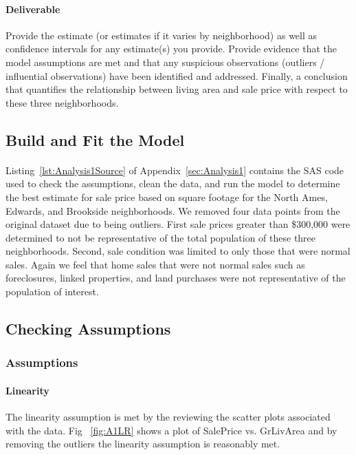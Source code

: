 \documentclass[11pt]{scrartcl} %
\begin{document}
\paragraph{Deliverable} Provide the estimate (or estimates if it varies by neighborhood) as well as confidence intervals for any estimate(s) you provide. Provide evidence that the model assumptions are met and that any suspicious observations (outliers / influential observations) have been identified and addressed. Finally, a conclusion that quantifies the relationship between living area and sale price with respect to these three neighborhoods.
\subsection{Build and Fit the Model}
\paragraph{} Listing~\ref{lst:Analysis1Source} of Appendix~\ref{sec:Analysis1} contains the SAS code used to check the assumptions, clean the data, and run the model to determine the best estimate for sale price based on square footage for the North Ames, Edwards, and Brookside neighborhoods. We removed four data points from the original dataset due to being outliers. First sale prices greater than \$300,000 were determined to not be representative of the total population of these three neighborhoods. Second, sale condition was limited to only those that were normal sales. Again we feel that home sales that were not normal sales such as foreclosures, linked properties, and land purchases were not representative of the population of interest.


\subsection{Checking Assumptions}
\subsubsection{Assumptions}
\paragraph{Linearity} The linearity assumption is met by the reviewing the scatter plots associated with the data. Fig ~\ref{fig:A1LR} shows a plot of SalePrice vs. GrLivArea and by removing the outliers the linearity assumption is reasonably met. 
\end{document}
